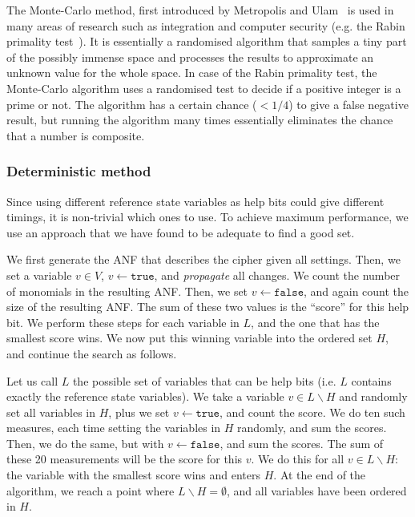 \documentclass{llncs}
\begin{document}
The Monte-Carlo method, first introduced by Metropolis and Ulam~\cite{Monte-Carlo-method} is used in many areas of research such as integration and computer security (e.g. the Rabin primality test~\cite{Rabin-primality-test}). It is essentially a randomised algorithm that samples a tiny part of the possibly immense space and processes the results to approximate an unknown value for the whole space. In case of the Rabin primality test, the Monte-Carlo algorithm uses a randomised test to decide if a positive integer is a prime or not. The algorithm has a certain chance ($<1/4$) to give a false negative result, but running the algorithm many times essentially eliminates the chance that a number is composite.

\subsubsection{Deterministic method}
Since using different reference state variables as help bits could give different timings, it is non-trivial which ones to use. To achieve maximum performance, we use an approach that we have found to be adequate to find a good set.

We first generate the ANF that describes the cipher given all settings. Then, we set a variable $v \in V$, $v \leftarrow \texttt{true}$, and \emph{propagate} all changes. We count the number of monomials in the resulting ANF. Then, we set $v\leftarrow \texttt{false}$, and again count the size of the resulting ANF. The sum of these two values is the ``score'' for this help bit. We perform these steps for each variable in $L$, and the one that has the smallest score wins. We now put this winning variable into the ordered set $H$, and continue the search as follows.

Let us call $L$ the possible set of variables that can be help bits (i.e. $L$ contains exactly the reference state variables). We take a variable $v \in L\backslash H$ and randomly set all variables in $H$, plus we set $v \leftarrow \texttt{true}$, and count the score. We do ten such measures, each time setting the variables in $H$ randomly, and sum the scores. Then, we do the same, but with  $v \leftarrow \texttt{false}$, and sum the scores. The sum of these 20 measurements will be the score for this $v$. We do this for all $v \in L \backslash H$: the variable with the smallest score wins and enters $H$. At the end of the algorithm, we reach a point where $L\backslash  H = \emptyset$, and all variables have been ordered in $H$.
\end{document}
